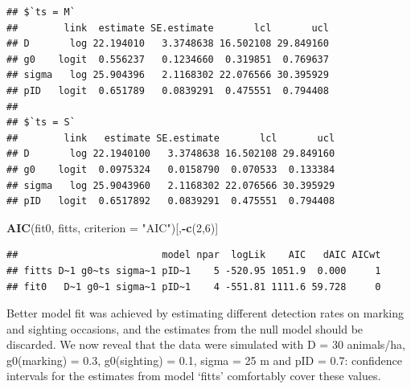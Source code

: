 \documentclass[
]{book}
\newenvironment{Shaded}{\begin{snugshade}}{\end{snugshade}}
\newcommand{\AttributeTok}[1]{\textcolor[rgb]{0.13,0.29,0.53}{#1}}
\newcommand{\ConstantTok}[1]{\textcolor[rgb]{0.56,0.35,0.01}{#1}}
\newcommand{\DecValTok}[1]{\textcolor[rgb]{0.00,0.00,0.81}{#1}}
\newcommand{\FunctionTok}[1]{\textcolor[rgb]{0.13,0.29,0.53}{\textbf{#1}}}
\newcommand{\NormalTok}[1]{#1}
\newcommand{\OtherTok}[1]{\textcolor[rgb]{0.56,0.35,0.01}{#1}}
\newcommand{\SpecialCharTok}[1]{\textcolor[rgb]{0.81,0.36,0.00}{\textbf{#1}}}
\newcommand{\StringTok}[1]{\textcolor[rgb]{0.31,0.60,0.02}{#1}}
\begin{document}
\begin{Shaded}
\end{Shaded}

\begin{verbatim}
## $`ts = M`
##        link  estimate SE.estimate       lcl       ucl
## D       log 22.194010   3.3748638 16.502108 29.849160
## g0    logit  0.556237   0.1234660  0.319851  0.769637
## sigma   log 25.904396   2.1168302 22.076566 30.395929
## pID   logit  0.651789   0.0839291  0.475551  0.794408
## 
## $`ts = S`
##        link   estimate SE.estimate       lcl       ucl
## D       log 22.1940100   3.3748638 16.502108 29.849160
## g0    logit  0.0975324   0.0158790  0.070533  0.133384
## sigma   log 25.9043960   2.1168302 22.076566 30.395929
## pID   logit  0.6517892   0.0839291  0.475551  0.794408
\end{verbatim}

\begin{Shaded}
\begin{Highlighting}[]
\FunctionTok{AIC}\NormalTok{(fit0, fitts, }\AttributeTok{criterion =} \StringTok{"AIC"}\NormalTok{)[,}\SpecialCharTok{{-}}\FunctionTok{c}\NormalTok{(}\DecValTok{2}\NormalTok{,}\DecValTok{6}\NormalTok{)]}
\end{Highlighting}
\end{Shaded}

\begin{verbatim}
##                         model npar  logLik    AIC   dAIC AICwt
## fitts D~1 g0~ts sigma~1 pID~1    5 -520.95 1051.9  0.000     1
## fit0   D~1 g0~1 sigma~1 pID~1    4 -551.81 1111.6 59.728     0
\end{verbatim}

Better model fit was achieved by estimating different detection rates on marking and sighting occasions, and the estimates from the null model should be discarded. We now reveal that the data were simulated with D = 30 animals/ha, g0(marking) = 0.3, g0(sighting) = 0.1, sigma = 25 m and pID = 0.7: confidence intervals for the estimates from model `fitts' comfortably cover these values.
\end{document}
